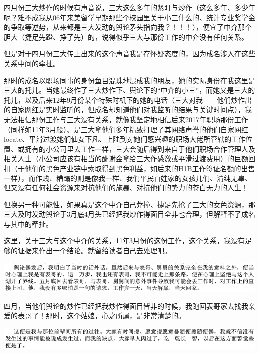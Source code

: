 \documentclass[9pt, b5paper]{article}
\begin{document}
四月份三大炒作的时候有声音说，三大这么多年的紧盯与炒作（这么多年、多少年呢？难不成我从06年来美留学早期那些个校园里关于小三什么的、统计专业奖学金的争取等逆势，从来都是三大发动的舆论矛头指向我？！！！），便宜了中介那个胆大（捷足先蹬、挣了先）的，说得似乎三大与那份工作的中介没有任何关系。

但是对于四月份三大传上出来的这个声音我是存怀疑态度的，因为成名涉入在这些关系中间的牵扯。 

那时的成名以职场同事的身份鱼目混珠地混成我的朋友，她的实际身份在我这里是三大的托儿。当她最终作了三大炒作下、舆论下的“中介的小三”，而她又是三大的托儿，以及后来12年9月份某个特殊时机下的她的电话（三大对我——他们炒作出的自家网红是实时监听的，但成名却知道他们对我监听的结果与关键时间点），我无法相信那份工作与三大没有关系，就像我坚定地相信后来2017年职场那份工作（同样如11年3月般）、是三大拿他们多年精致打理了其网络声誉的他们自家网红locate、平滑过渡她们仙女下凡、上陆到对她们感兴趣的职场大佬所管辖的工作位置、或拥有的小公司里去工作一样，三大会随后得到来自于他们职场合作管理人及相关人士（小公司应该有相当的酬谢金拿给三大作感激或平滑过渡费用）的巨额回扣（于他们的黑色产业链中索取得到黑色利益，如后来的H1B工作签证名额的出售一样），而作贱、糟蹋的则是像我一样、我们平民百姓家的女孩儿们、清纯无辜、但又没有任何社会资源来对抗他们的施暴、对抗他们的势力的苍白无力的人生！

但换另一种可能性，如果真是这个中介自己莽撞、捷足先抢了三大的女色资源，那三大及时发动舆论于3月底4月头已经把我炒作得面目全非也合理，但解释不了成名与其中的牵扯。

这里，关于三大与这个中介的关系，11年3月份的这份工作，这个关系，我没有足够的证据来作出一个结论。就留给读者自己去处理吧。

\begin{center}
\includegraphics[width=.9\linewidth]{./pic/backups_plans_20210412_104930.png}
\end{center}

四月，当他们舆论的炒作已经把我炒作得面目皆非的时候，我跑回表哥家去找我亲爱的表哥了！那时，这个姑娘，心之所属，是非常清楚的。

\begin{center}
\includegraphics[width=.9\linewidth]{./pic/backups_plans_20210412_104959.png}
\end{center}
\end{document}
